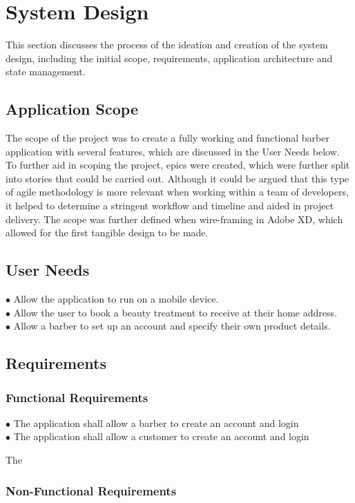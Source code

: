 \documentclass[12pt]{article}
\begin{document}
	\section{System Design}
	This section discusses the process of the ideation and creation of the system design, including the initial scope, requirements, application architecture and state management.
	\subsection{Application Scope}
	The scope of the project was to create a fully working and functional barber application with several features, which are discussed in the User Needs below. To further aid in scoping the project, epics were created, which were further split into stories that could be carried out. Although it could be argued that this type of agile methodology is more relevant when working within a team of developers, it helped to determine a stringent workflow and timeline and aided in project delivery.
	The scope was further defined when wire-framing in Adobe XD, which allowed for the first tangible design to be made.
	
	\subsection{User Needs}
	$\bullet$ Allow the application to run on a mobile device.
	\\
	$\bullet$ Allow the user to book a beauty treatment to receive at their home address.
	\\
	$\bullet$ Allow a barber to set up an account and specify their own product details.

	\subsection{Requirements}
	\subsubsection{Functional Requirements}
	
	$\bullet$ The application shall allow a barber to create an account and login
	\\
	$\bullet$ The application shall allow a customer to create an account and login
	
	The	
	\subsubsection{Non-Functional Requirements}
\end{document}
